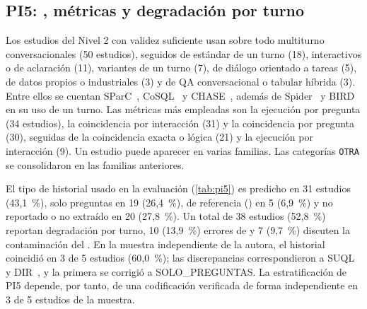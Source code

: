 \subsection{PI5: , métricas y degradación por turno}
\label{sec:res-pi5}



Los \nUmbral{} estudios del Nivel 2 con validez suficiente usan sobre todo  multiturno conversacionales (50 estudios), seguidos de  estándar de un turno (18), interactivos o de aclaración (11), variantes de un turno (7), de diálogo orientado a tareas (5), de datos propios o industriales (3) y de QA conversacional o tabular híbrida (3). Entre ellos se cuentan SParC~\cite{Yu2019SParC}, CoSQL~\cite{Yu2019CoSQL} y CHASE~\cite{Guo2021Chase}, además de Spider~\cite{Yu2018Spider} y BIRD~\cite{Li2023BIRD} en su uso de un turno. Las métricas más empleadas son la ejecución por pregunta (34 estudios), la coincidencia por interacción (31) y la coincidencia por pregunta (30), seguidas de la coincidencia exacta o lógica (21) y la ejecución por interacción (9). Un estudio puede aparecer en varias familias. Las categorías \texttt{OTRA} se consolidaron en las familias anteriores.



El tipo de historial usado en la evaluación (\cref{tab:pi5}) es predicho en 31 estudios (43,1~\%), solo preguntas en 19 (26,4~\%), de referencia () en 5 (6,9~\%) y no reportado o no extraído en 20 (27,8~\%). Un total de 38 estudios (52,8~\%) reportan degradación por turno, 10 (13,9~\%) errores de  y 7 (9,7~\%) discuten la contaminación del . En la muestra independiente de la autora, el historial coincidió en 3 de 5 estudios (60,0~\%); las discrepancias correspondieron a SUQL~\cite{Liu2024SUQL} y DIR~\cite{Li2023DIR}, y la primera se corrigió a SOLO\_PREGUNTAS. La estratificación de PI5 depende, por tanto, de una codificación verificada de forma independiente en 3 de 5 estudios de la muestra.

